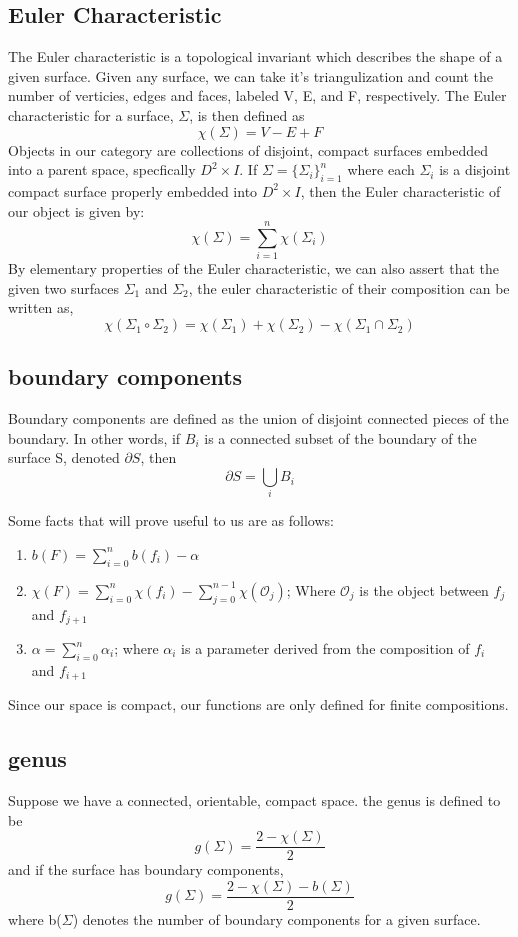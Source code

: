 \documentclass[11pt]{article}
\newcommand{\parent}{D^2\times I}
\begin{document}
\subsection*{Euler Characteristic}
The Euler characteristic is a topological invariant which describes the shape of a given surface. Given any surface, we can take it's triangulization and count the number of verticies, edges and faces, labeled V, E, and F, respectively. The Euler characteristic for a surface, $\Sigma$, is then defined as
\[ \chi(\Sigma) = V-E+F \]
Objects in our category are collections of disjoint, compact surfaces embedded into a parent space, specfically $\parent$. If $\Sigma = \{ \Sigma_i \}_{i=1}^n$ where each $\Sigma_i$ is a disjoint compact surface properly embedded into $\parent$, then the Euler characteristic of our object is given by:
\[ \chi(\Sigma) = \sum\limits_{i=1}^n \chi(\Sigma_i)\]
By elementary properties of the Euler characteristic, we can also assert that the given two surfaces $\Sigma_1$ and $\Sigma_2$, the euler characteristic of their composition can be written as, 
\[ \chi(\Sigma_1\circ\Sigma_2) = \chi(\Sigma_1)+\chi(\Sigma_2)-\chi(\Sigma_1\cap\Sigma_2)\]

\subsection*{boundary components}

Boundary components are defined as the union of disjoint connected pieces of the boundary. In other words, if $B_i$ is a connected subset of the boundary of the surface S, denoted $\partial S$, then
\[\partial S = \bigcup_i B_i\]

Some facts that will prove useful to us are as follows:

\begin{enumerate}
\item $b(F) = \sum_{i=0}^{n} b(f_i)-\alpha$
\item $\chi(F) = \sum_{i=0}^{n} \chi(f_i)-\sum_{j=0}^{n-1}\chi(\mathscr{O}_j)$; Where $\mathscr{O}_j$ is the object between $f_j$ and $f_{j+1}$
\item $\alpha = \sum_{i=0}^{n}\alpha_i$; where $\alpha_i$ is a parameter derived from the composition of $f_i$ and $f_{i+1}$
\end{enumerate}

Since our space is compact, our functions are only defined for finite compositions.

\subsection*{genus}
Suppose we have a connected, orientable, compact space. the genus is defined to be 
\[ g(\Sigma) = \frac{2-\chi(\Sigma)}{2} \]
and if the surface has boundary components,
\[g(\Sigma) = \frac{2-\chi(\Sigma) - b(\Sigma)}{2}\]
where b($\Sigma$) denotes the number of boundary components for a given surface.
\end{document}
